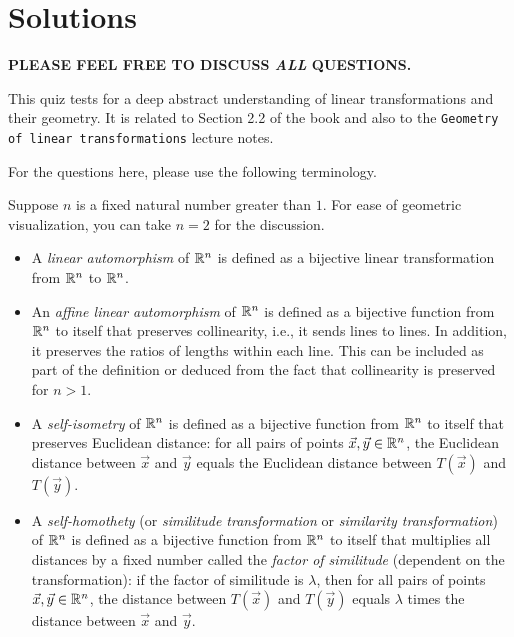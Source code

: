 \documentclass[10pt]{amsart}
\begin{document}
\section{Solutions}

{\bf PLEASE FEEL FREE TO DISCUSS {\em ALL} QUESTIONS.}

This quiz tests for a deep abstract understanding of linear
transformations and their geometry. It is related to Section 2.2 of
the book and also to the {\tt Geometry of linear transformations}
lecture notes.

For the questions here, please use the following terminology.

Suppose $n$ is a fixed natural number greater than $1$. For ease of
geometric visualization, you can take $n = 2$ for the discussion.

\begin{itemize}
\item A {\em linear automorphism} of $\mathbb{R}^n$ is defined as
  a bijective linear transformation from $\mathbb{R}^n$ to $\mathbb{R}^n$.
\item An {\em affine linear automorphism} of $\mathbb{R}^n$ is defined as a
  bijective function from $\mathbb{R}^n$ to itself that preserves
  collinearity, i.e., it sends lines to lines. In addition, it
  preserves the ratios of lengths within each line. This can be
  included as part of the definition or deduced from the fact that
  collinearity is preserved for $n > 1$.
\item A {\em self-isometry} of $\mathbb{R}^n$ is defined as a bijective
  function from $\mathbb{R}^n$ to itself that preserves Euclidean distance:
  for all pairs of points $\vec{x},\vec{y} \in \mathbb{R}^n$, the Euclidean
  distance between $\vec{x}$ and $\vec{y}$ equals the Euclidean
  distance between $T(\vec{x})$ and $T(\vec{y})$.
\item A {\em self-homothety} (or {\em similitude transformation} or
  {\em similarity transformation}) of $\mathbb{R}^n$ is defined as a bijective
  function from $\mathbb{R}^n$ to itself that multiplies all distances by a
  fixed number called the {\em factor of similitude} (dependent on the
  transformation): if the factor of similitude is $\lambda$, then for
  all pairs of points $\vec{x},\vec{y} \in \mathbb{R}^n$, the distance between
  $T(\vec{x})$ and $T(\vec{y})$ equals $\lambda$ times the distance
  between $\vec{x}$ and $\vec{y}$.
\end{itemize}
\end{document}
